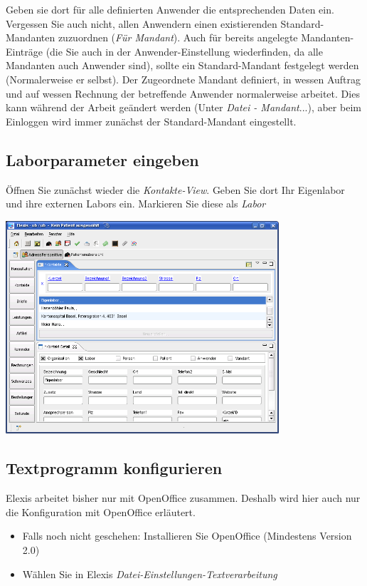 Geben sie dort für alle definierten Anwender die entsprechenden Daten ein. Vergessen Sie auch nicht, allen Anwendern einen existierenden Standard-Mandanten zuzuordnen (\textit{Für Mandant}). Auch für bereits angelegte Mandanten-Einträge (die Sie auch in der Anwender-Einstellung wiederfinden, da alle Mandanten auch Anwender sind), sollte ein Standard-Mandant festgelegt werden (Normalerweise er selbst). Der Zugeordnete Mandant definiert, in wessen Auftrag und auf wessen Rechnung der betreffende Anwender normalerweise arbeitet. Dies kann während der Arbeit geändert werden (Unter \textit{Datei - Mandant}...), aber beim Einloggen wird immer zunächst der Standard-Mandant eingestellt.

\subsection{Laborparameter eingeben}
Öffnen Sie zunächst wieder die \textit{Kontakte-View}. Geben Sie dort Ihr Eigenlabor und ihre externen Labors ein. Markieren Sie diese als \textit{Labor}

\includegraphics[width=4in]{images/grundkonfmand1.png}
\subsection{Textprogramm konfigurieren}

Elexis arbeitet bisher nur mit OpenOffice zusammen. Deshalb wird hier auch nur die Konfiguration mit OpenOffice erläutert.

\begin{itemize}
 \item Falls noch nicht geschehen: Installieren Sie OpenOffice (Mindestens Version 2.0)
 \item Wählen Sie in Elexis \textit{Datei-Einstellungen-Textverarbeitung}
\end{itemize}

